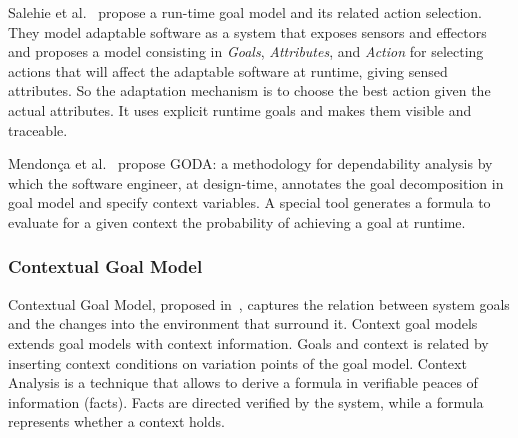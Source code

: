 Salehie et al.~\cite{salehie_towards_2012} propose a run-time goal model and its related action selection. They model adaptable software as a system that exposes sensors and effectors and proposes a model consisting in \emph{Goals}, \emph{Attributes}, and \emph{Action} for selecting actions that will affect the adaptable software at runtime, giving sensed attributes.
So the adaptation mechanism is to choose the best action given the actual attributes.
It uses explicit runtime goals and makes them visible and traceable.

Mendonça et al.~\cite{mendonca_dependability_2015} propose GODA: a methodology  for dependability analysis by which the software engineer, at design-time, annotates the goal decomposition in goal model and specify context variables. A special tool generates a formula to evaluate for a given context the probability of achieving a goal at runtime.

\subsubsection{Contextual Goal Model}

Contextual Goal Model, proposed in~\cite{ali_goal-based_2010}, captures the relation between system goals and the changes into the environment that surround it. Context goal models extends goal models with context information. Goals and context is related by inserting context conditions on variation points of the goal model. Context Analysis is a technique that allows to derive a formula in verifiable peaces of information (facts). Facts are directed verified by the system, while a formula represents whether a context holds.
